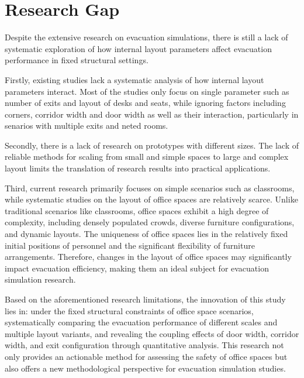 \section{Research Gap}
Despite the extensive research on evacuation simulations, there is still a lack of systematic exploration of how internal layout parameters affect evacuation performance in fixed structural settings. 

Firstly, existing studies lack a systematic analysis of how internal layout parameters interact. Most of the studies only focus on single parameter such as number of exits and layout of desks and seats, while ignoring factors including corners, corridor width and door width as well as their interaction, particularly in senarios with multiple exits and neted rooms.

Secondly, there is a lack of research on prototypes with different sizes. The lack of reliable methods for scaling from small and simple spaces to large and complex layout limits the translation of research results into practical applications.

Third, current research primarily focuses on simple scenarios such as classrooms, while systematic studies on the layout of office spaces are relatively scarce. Unlike traditional scenarios like classrooms, office spaces exhibit a high degree of complexity, including densely populated crowds, diverse furniture configurations, and dynamic layouts. The uniqueness of office spaces lies in the relatively fixed initial positions of personnel and the significant flexibility of furniture arrangements. Therefore, changes in the layout of office spaces may significantly impact evacuation efficiency, making them an ideal subject for evacuation simulation research.

Based on the aforementioned research limitations, the innovation of this study lies in: under the fixed structural constraints of office space scenarios, systematically comparing the evacuation performance of different scales and multiple layout variants, and revealing the coupling effects of door width, corridor width, and exit configuration through quantitative analysis. This research not only provides an actionable method for assessing the safety of office spaces but also offers a new methodological perspective for evacuation simulation studies.